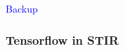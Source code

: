 \documentclass{beamer}
\begin{document}
\begin{frame}
  \begin{center}
    \huge
    \textcolor{blue}{Backup}
  \end{center}
\end{frame}

\begin{frame}
  \frametitle{Tensorflow in STIR}
    \begin{figure}
    \centering

\end{figure}
\end{frame}
\end{document}
